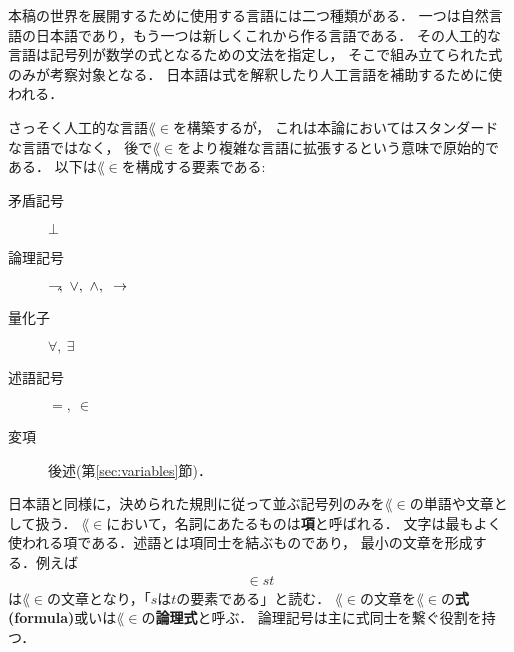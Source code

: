 	本稿の世界を展開するために使用する言語には二つ種類がある．
	一つは自然言語の日本語であり，もう一つは新しくこれから作る言語である．
	その人工的な言語は記号列が数学の式となるための文法を指定し，
	そこで組み立てられた式のみが考察対象となる．
	日本語は式を解釈したり人工言語を補助するために使われる．
	
	さっそく人工的な言語$\lang{\in}$を構築するが，
	これは本論においてはスタンダードな言語ではなく，
	後で$\lang{\in}$をより複雑な言語に拡張するという意味で原始的である．
	以下は$\lang{\in}$を構成する要素である:
	\begin{description}
		\item[矛盾記号] $\bot$
		\item[論理記号] $\negation,\ \vee,\ \wedge,\ \rarrow$
		\item[量化子] $\forall,\ \exists$
		\item[述語記号] $=,\ \in$
		\item[変項] 後述(第\ref{sec:variables}節)．
			
			
	\end{description}
	
	日本語と同様に，決められた規則に従って並ぶ記号列のみを$\lang{\in}$の単語や文章として扱う．
	$\lang{\in}$において，名詞にあたるものは{\bf 項}と呼ばれる．
	文字は最もよく使われる項である．述語とは項同士を結ぶものであり，
	最小の文章を形成する．例えば
	\begin{align}
		\in st
	\end{align}
	は$\lang{\in}$の文章となり，「$s$は$t$の要素である」と読む．
	$\lang{\in}$の文章を$\lang{\in}$の{\bf 式}
	{\bf (formula)}或いは$\lang{\in}$の{\bf 論理式}と呼ぶ．
	論理記号は主に式同士を繋ぐ役割を持つ．
	
